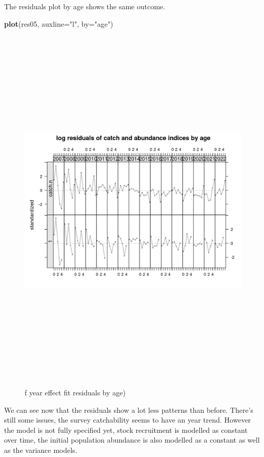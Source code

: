 \documentclass[
]{book}
\newenvironment{Shaded}{\begin{snugshade}}{\end{snugshade}}
\newcommand{\AttributeTok}[1]{\textcolor[rgb]{0.13,0.29,0.53}{#1}}
\newcommand{\FunctionTok}[1]{\textcolor[rgb]{0.13,0.29,0.53}{\textbf{#1}}}
\newcommand{\NormalTok}[1]{#1}
\newcommand{\StringTok}[1]{\textcolor[rgb]{0.31,0.60,0.02}{#1}}
\begin{document}
The residuals plot by age shows the same outcome.

\begin{Shaded}
\begin{Highlighting}[]
\FunctionTok{plot}\NormalTok{(res05, }\AttributeTok{auxline=}\StringTok{"l"}\NormalTok{, }\AttributeTok{by=}\StringTok{"age"}\NormalTok{)}
\end{Highlighting}
\end{Shaded}

\begin{figure}
\includegraphics[width=25cm,height=18cm,angle=90]{_bookdown_files/_main_files/figure-html/fyearresbyage-1} \caption{f year effect fit residuals by age)}\label{fig:fyearresbyage}
\end{figure}

We can see now that the residuals show a lot less patterns than before. There's still some issues, the survey catchability seems to have an year trend. However the model is not fully specified yet, stock recruitment is modelled as constant over time, the initial population abundance is also modelled as a constant as well as the variance models.
\end{document}
